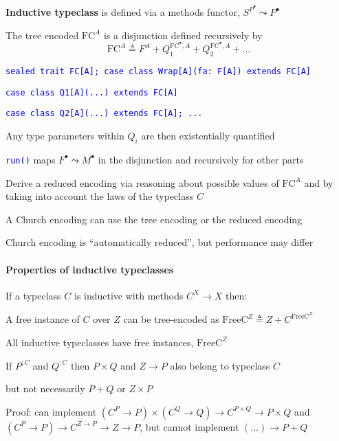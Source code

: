 \textbf{Inductive typeclass} is defined via a methods functor, $S^{P^{\bullet}}\leadsto P^{\bullet}$

The tree encoded $\text{FC}^{A}$ is a disjunction defined recursively
by{\footnotesize{}
\[
\text{FC}^{A}\triangleq F^{A}+Q_{1}^{\text{FC}^{\bullet},A}+Q_{2}^{\text{FC}^{\bullet},A}+...
\]
}{\footnotesize\par}

\texttt{\textcolor{blue}{\footnotesize{}sealed trait FC{[}A{]}; case
class Wrap{[}A{]}(fa: F{[}A{]}) extends FC{[}A{]}}}{\footnotesize\par}

\texttt{\textcolor{blue}{\footnotesize{}case class Q1{[}A{]}(...)
extends FC{[}A{]}}}{\footnotesize\par}

\texttt{\textcolor{blue}{\footnotesize{}case class Q2{[}A{]}(...)
extends FC{[}A{]}; ...}}{\footnotesize\par}

Any type parameters within $Q_{i}$ are then existentially quantified

\texttt{\textcolor{blue}{\footnotesize{}run()}} maps $F^{\bullet}\leadsto M^{\bullet}$
in the disjunction and recursively for other parts

Derive a reduced encoding via reasoning about possible values of $\text{FC}^{A}$
and by taking into account the laws of the typeclass $C$

A Church encoding can use the tree encoding or the reduced encoding

Church encoding is \textsf{``}automatically reduced\textsf{''}, but performance may
differ


\paragraph{Properties of inductive typeclasses}

If a typeclass $C$ is inductive with methods $C^{X}\rightarrow X$
then:

A free instance of $C$ over $Z$ can be tree-encoded as {\footnotesize{}$\text{FreeC}^{Z}\triangleq Z+C^{\text{FreeC}^{Z}}$} 

All inductive typeclasses have free instances, $\text{FreeC}^{Z}$

If $P^{:C}$ and $Q^{:C}$ then $P\times Q$ and $Z\rightarrow P$
also belong to typeclass $C$

but not necessarily $P+Q$ or $Z\times P$

Proof: can implement $(C^{P}\rightarrow P)\times(C^{Q}\rightarrow Q)\rightarrow C^{P\times Q}\rightarrow P\times Q$
and $\left(C^{P}\rightarrow P\right)\rightarrow C^{Z\rightarrow P}\rightarrow Z\rightarrow P$,
but cannot implement $\left(...\right)\rightarrow P+Q$

